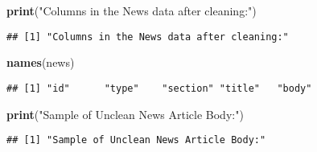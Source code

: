 \documentclass[]{article}
\newenvironment{Shaded}{\begin{snugshade}}{\end{snugshade}}
\newcommand{\KeywordTok}[1]{\textcolor[rgb]{0.13,0.29,0.53}{\textbf{#1}}}
\newcommand{\StringTok}[1]{\textcolor[rgb]{0.31,0.60,0.02}{#1}}
\newcommand{\CommentTok}[1]{\textcolor[rgb]{0.56,0.35,0.01}{\textit{#1}}}
\newcommand{\NormalTok}[1]{#1}
\begin{document}
\begin{table}[!h]
{\begin{tabular}[t]{lllll}
\bottomrule
\end{tabular}}
\end{table}


\begin{Shaded}
\begin{Highlighting}[]
\KeywordTok{print}\NormalTok{(}\StringTok{"Columns in the News data after cleaning:"}\NormalTok{)}
\end{Highlighting}
\end{Shaded}

\begin{verbatim}
## [1] "Columns in the News data after cleaning:"
\end{verbatim}

\begin{Shaded}
\begin{Highlighting}[]
\KeywordTok{names}\NormalTok{(news)}
\end{Highlighting}
\end{Shaded}

\begin{verbatim}
## [1] "id"      "type"    "section" "title"   "body"
\end{verbatim}

\begin{Shaded}
\end{Shaded}

\begin{Shaded}
\begin{Highlighting}[]
\KeywordTok{print}\NormalTok{(}\StringTok{"Sample of Unclean News Article Body:"}\NormalTok{)}
\end{Highlighting}
\end{Shaded}

\begin{verbatim}
## [1] "Sample of Unclean News Article Body:"
\end{verbatim}
\end{document}
